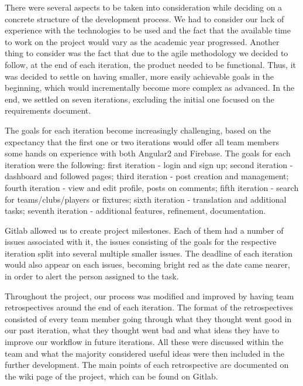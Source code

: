 \documentclass{l3proj}
\begin{document}
There were several aspects to be taken into consideration while deciding on a concrete structure of the development process. We had to consider our lack of experience with the technologies to be used and the fact that the available time to work on the project would vary as the academic year progressed. Another thing to consider was the fact that due to the agile methodology we decided to follow, at the end of each iteration, the product needed to be functional. Thus, it was decided to settle on having smaller, more easily achievable goals in the beginning, which would incrementally become more complex as advanced. In the end, we settled on seven iterations, excluding the initial one focused on the requirements document.


The goals for each iteration become increasingly challenging, based on the expectancy that the first one or two iterations would offer all team members some hands on experience with both Angular2 and Firebase. The goals for each iteration were the following: first iteration - login and sign up; second iteration - dashboard and followed pages; third iteration - post creation and management; fourth iteration - view and edit profile, posts on comments; fifth iteration - search for teams/clubs/players or fixtures; sixth iteration - translation and additional tasks; seventh iteration - additional features, refinement, documentation.



Gitlab allowed us to create project milestones. Each of them had a number of issues associated with it, the issues consisting of the goals for the respective iteration split into several multiple smaller issues. The deadline of each iteration would also appear on each issues, becoming bright red as the date came nearer, in order to alert the person assigned to the task.

Throughout the project, our process was modified and improved by having team retrospectives around the end of each iteration. The format of the retrospectives consisted of every team member going through what they thought went good in our past iteration, what they thought went bad and what ideas they have to improve our workflow in future iterations. All these were discussed within the team and what the majority considered useful ideas were then included in the further development. The main points of each retrospective are documented on the wiki page of the project, which can be found on Gitlab.
\end{document}
